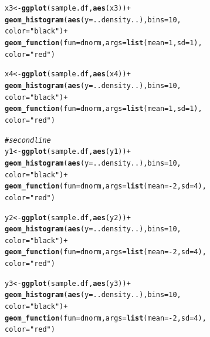 \documentclass{article}\usepackage[]{graphicx}\usepackage[]{color}
\makeatletter
\newcommand{\hlnum}[1]{\textcolor[rgb]{0.686,0.059,0.569}{#1}}%
\newcommand{\hlstr}[1]{\textcolor[rgb]{0.192,0.494,0.8}{#1}}%
\newcommand{\hlcom}[1]{\textcolor[rgb]{0.678,0.584,0.686}{\textit{#1}}}%
\newcommand{\hlopt}[1]{\textcolor[rgb]{0,0,0}{#1}}%
\newcommand{\hlstd}[1]{\textcolor[rgb]{0.345,0.345,0.345}{#1}}%
\newcommand{\hlkwb}[1]{\textcolor[rgb]{0.69,0.353,0.396}{#1}}%
\newcommand{\hlkwc}[1]{\textcolor[rgb]{0.333,0.667,0.333}{#1}}%
\newcommand{\hlkwd}[1]{\textcolor[rgb]{0.737,0.353,0.396}{\textbf{#1}}}%
\newenvironment{kframe}{%
 \def\at@end@of@kframe{}%
 \ifinner\ifhmode%
  \def\at@end@of@kframe{\end{minipage}}%
  \begin{minipage}{\columnwidth}%
 \fi\fi%
 \def\FrameCommand##1{\hskip\@totalleftmargin \hskip-\fboxsep
 \colorbox{shadecolor}{##1}\hskip-\fboxsep
     \hskip-\linewidth \hskip-\@totalleftmargin \hskip\columnwidth}%
 \MakeFramed {\advance\hsize-\width
   \@totalleftmargin\z@ \linewidth\hsize
   \@setminipage}}%
 {\par\unskip\endMakeFramed%
 \at@end@of@kframe}
\newenvironment{knitrout}{}{} %
\makeatother
\begin{document}
\begin{enumerate}
\begin{enumerate}
\begin{knitrout}
\begin{kframe}
\begin{alltt}
        \hlstd{x3}\hlkwb{<-}\hlkwd{ggplot}\hlstd{(sample.df,} \hlkwd{aes}\hlstd{(x3))}\hlopt{+}
          \hlkwd{geom_histogram}\hlstd{(}\hlkwd{aes}\hlstd{(}\hlkwc{y}\hlstd{=..density..),} \hlkwc{bins}\hlstd{=}\hlnum{10}\hlstd{,}
                         \hlkwc{color}\hlstd{=}\hlstr{"black"}\hlstd{)}\hlopt{+}
\hlkwd{geom_function}\hlstd{(}\hlkwc{fun}\hlstd{=dnorm,} \hlkwc{args} \hlstd{=} \hlkwd{list}\hlstd{(}\hlkwc{mean} \hlstd{=} \hlnum{1}\hlstd{,} \hlkwc{sd} \hlstd{=} \hlnum{1}\hlstd{),}
              \hlkwc{color}\hlstd{=}\hlstr{"red"}\hlstd{)}

        \hlstd{x4}\hlkwb{<-}\hlkwd{ggplot}\hlstd{(sample.df,} \hlkwd{aes}\hlstd{(x4))}\hlopt{+}
          \hlkwd{geom_histogram}\hlstd{(}\hlkwd{aes}\hlstd{(}\hlkwc{y}\hlstd{=..density..),} \hlkwc{bins}\hlstd{=}\hlnum{10}\hlstd{,}
                         \hlkwc{color}\hlstd{=}\hlstr{"black"}\hlstd{)}\hlopt{+}
\hlkwd{geom_function}\hlstd{(}\hlkwc{fun}\hlstd{=dnorm,} \hlkwc{args} \hlstd{=} \hlkwd{list}\hlstd{(}\hlkwc{mean} \hlstd{=} \hlnum{1}\hlstd{,} \hlkwc{sd} \hlstd{=} \hlnum{1}\hlstd{),}
              \hlkwc{color}\hlstd{=}\hlstr{"red"}\hlstd{)}


        \hlcom{#second line}
        \hlstd{y1}\hlkwb{<-}\hlkwd{ggplot}\hlstd{(sample.df,} \hlkwd{aes}\hlstd{(y1))}\hlopt{+}
          \hlkwd{geom_histogram}\hlstd{(}\hlkwd{aes}\hlstd{(}\hlkwc{y}\hlstd{=..density..),} \hlkwc{bins}\hlstd{=}\hlnum{10}\hlstd{,}
                         \hlkwc{color}\hlstd{=}\hlstr{"black"}\hlstd{)}\hlopt{+}
\hlkwd{geom_function}\hlstd{(}\hlkwc{fun}\hlstd{=dnorm,} \hlkwc{args} \hlstd{=} \hlkwd{list}\hlstd{(}\hlkwc{mean} \hlstd{=} \hlopt{-}\hlnum{2}\hlstd{,} \hlkwc{sd} \hlstd{=} \hlnum{4}\hlstd{),}
              \hlkwc{color}\hlstd{=}\hlstr{"red"}\hlstd{)}

        \hlstd{y2}\hlkwb{<-}\hlkwd{ggplot}\hlstd{(sample.df,} \hlkwd{aes}\hlstd{(y2))}\hlopt{+}
          \hlkwd{geom_histogram}\hlstd{(}\hlkwd{aes}\hlstd{(}\hlkwc{y}\hlstd{=..density..),} \hlkwc{bins}\hlstd{=}\hlnum{10}\hlstd{,}
                         \hlkwc{color}\hlstd{=}\hlstr{"black"}\hlstd{)}\hlopt{+}
\hlkwd{geom_function}\hlstd{(}\hlkwc{fun}\hlstd{=dnorm,} \hlkwc{args} \hlstd{=} \hlkwd{list}\hlstd{(}\hlkwc{mean} \hlstd{=} \hlopt{-}\hlnum{2}\hlstd{,} \hlkwc{sd} \hlstd{=} \hlnum{4}\hlstd{),}
              \hlkwc{color}\hlstd{=}\hlstr{"red"}\hlstd{)}

        \hlstd{y3}\hlkwb{<-}\hlkwd{ggplot}\hlstd{(sample.df,} \hlkwd{aes}\hlstd{(y3))}\hlopt{+}
          \hlkwd{geom_histogram}\hlstd{(}\hlkwd{aes}\hlstd{(}\hlkwc{y}\hlstd{=..density..),} \hlkwc{bins}\hlstd{=}\hlnum{10}\hlstd{,}
                         \hlkwc{color}\hlstd{=}\hlstr{"black"}\hlstd{)}\hlopt{+}
\hlkwd{geom_function}\hlstd{(}\hlkwc{fun}\hlstd{=dnorm,} \hlkwc{args} \hlstd{=} \hlkwd{list}\hlstd{(}\hlkwc{mean} \hlstd{=} \hlopt{-}\hlnum{2}\hlstd{,} \hlkwc{sd} \hlstd{=} \hlnum{4}\hlstd{),}
              \hlkwc{color}\hlstd{=}\hlstr{"red"}\hlstd{)}


\end{alltt}
\end{kframe}
\end{knitrout}
\end{enumerate}
\end{enumerate}
\end{document}
